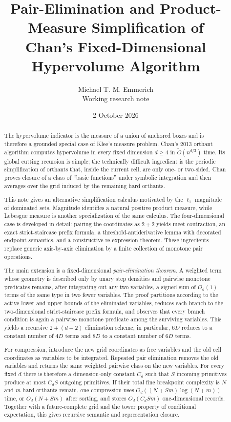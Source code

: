 \documentclass[12pt,a4paper]{article}
\title{Pair-Elimination and Product-Measure Simplification of\\Chan's Fixed-Dimensional Hypervolume Algorithm}
\author{Michael T. M. Emmerich\\\small Working research note}
\date{2 October 2026}
\theoremstyle{definition}
\newcommand{\1}{\mathbf 1}
\begin{document}
\maketitle

\begin{abstract}
The hypervolume indicator is the measure of a union of anchored boxes and is therefore a grounded special case of Klee's measure problem. Chan's 2013 orthant algorithm computes hypervolume in every fixed dimension $d\ge4$ in $\widetilde O(n^{d/3})$ time. Its global cutting recursion is simple; the technically difficult ingredient is the periodic simplification of orthants that, inside the current cell, are only one- or two-sided. Chan proves closure of a class of ``basic functions'' under symbolic integration and then averages over the grid induced by the remaining hard orthants.

This note gives an alternative simplification calculus motivated by the $\ell_1$ magnitude of dominated sets. Magnitude identifies a natural positive product measure, while Lebesgue measure is another specialization of the same calculus. The four-dimensional case is developed in detail: pairing the coordinates as $2+2$ yields meet contraction, an exact strict-staircase prefix formula, a threshold-antiderivative lemma with decorated endpoint semantics, and a constructive re-expression theorem. These ingredients replace generic axis-by-axis elimination by a finite collection of monotone pair operations.

The main extension is a fixed-dimensional \emph{pair-elimination theorem}. A weighted term whose geometry is described only by unary step densities and pairwise monotone predicates remains, after integrating out any two variables, a signed sum of $O_d(1)$ terms of the same type in two fewer variables. The proof partitions according to the active lower and upper bounds of the eliminated variables, reduces each branch to the two-dimensional strict-staircase prefix formula, and observes that every branch condition is again a pairwise monotone predicate among the surviving variables. This yields a recursive $2+(d-2)$ elimination scheme; in particular, $6D$ reduces to a constant number of $4D$ terms and $8D$ to a constant number of $6D$ terms.

For compression, introduce the new grid coordinates as free variables and the old cell coordinates as variables to be integrated. Repeated pair elimination removes the old variables and returns the same weighted pairwise class on the new variables. For every fixed $d$ there is therefore a dimension-only constant $C_d$ such that $S$ incoming primitives produce at most $C_dS$ outgoing primitives. If their total fine breakpoint complexity is $N$ and $m$ hard orthants remain, one compression uses $O_d((N+Sm)\log(N+m))$ time, or $O_d(N+Sm)$ after sorting, and stores $O_d(C_dSm)$ one-dimensional records. Together with a future-complete grid and the tower property of conditional expectation, this gives recursive semantic and representation closure.


\end{abstract}
\end{document}
